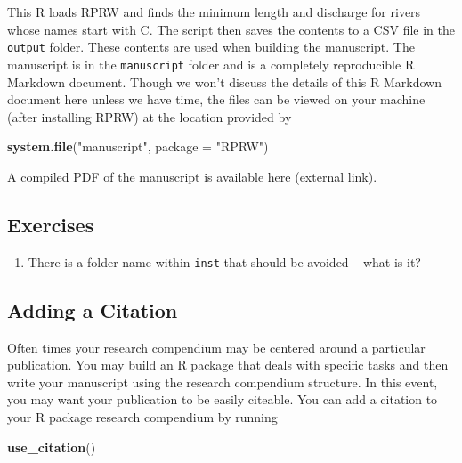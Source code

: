 \documentclass[
]{book}
\newenvironment{Shaded}{\begin{snugshade}}{\end{snugshade}}
\newcommand{\DataTypeTok}[1]{\textcolor[rgb]{0.13,0.29,0.53}{#1}}
\newcommand{\KeywordTok}[1]{\textcolor[rgb]{0.13,0.29,0.53}{\textbf{#1}}}
\newcommand{\NormalTok}[1]{#1}
\newcommand{\StringTok}[1]{\textcolor[rgb]{0.31,0.60,0.02}{#1}}
\providecommand{\tightlist}{%
  \setlength{\itemsep}{0pt}\setlength{\parskip}{0pt}}
\begin{document}
This R loads RPRW and finds the minimum length and discharge for rivers whose names start with C. The script then saves the contents to a CSV file in the \texttt{output} folder. These contents are used when building the manuscript. The manuscript is in the \texttt{manuscript} folder and is a completely reproducible R Markdown document. Though we won't discuss the details of this R Markdown document here unless we have time, the files can be viewed on your machine (after installing RPRW) at the location provided by

\begin{Shaded}
\begin{Highlighting}[]
\KeywordTok{system.file}\NormalTok{(}\StringTok{"manuscript"}\NormalTok{, }\DataTypeTok{package =} \StringTok{"RPRW"}\NormalTok{)}
\end{Highlighting}
\end{Shaded}

A compiled PDF of the manuscript is available here (\href{https://github.com/michaeldumelle/RPRW/blob/main/inst/manuscript/manuscript.pdf}{external link}).

\hypertarget{ex-set9}{%
\subsection{Exercises}\label{ex-set9}}

\begin{enumerate}
\def\labelenumi{\arabic{enumi}.}
\tightlist
\item
  There is a folder name within \texttt{inst} that should be avoided -- what is it?
\end{enumerate}

\hypertarget{citation}{%
\subsection{Adding a Citation}\label{citation}}

Often times your research compendium may be centered around a particular publication. You may build an R package that deals with specific tasks and then write your manuscript using the research compendium structure. In this event, you may want your publication to be easily citeable. You can add a citation to your R package research compendium by running

\begin{Shaded}
\begin{Highlighting}[]
\KeywordTok{use_citation}\NormalTok{()}
\end{Highlighting}
\end{Shaded}
\end{document}
